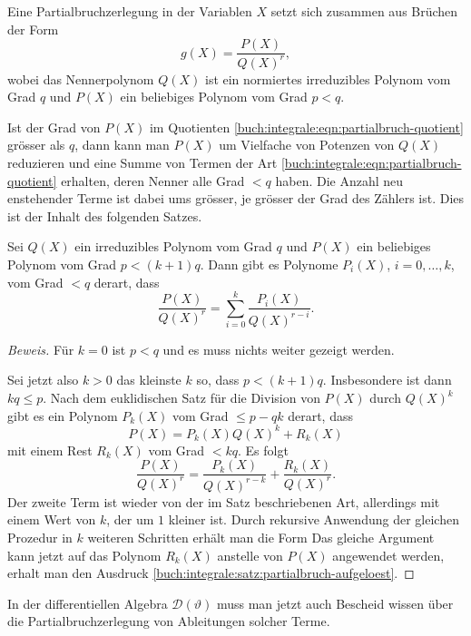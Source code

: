 Eine Partialbruchzerlegung in der Variablen $X$ setzt sich zusammen
aus Brüchen der Form
\begin{equation}
g(X)
=
\frac{P(X)}{Q(X)^r},
\label{buch:integrale:eqn:partialbruch-quotient}
\end{equation}
wobei das Nennerpolynom $Q(X)$ ist ein normiertes irreduzibles Polynom
vom Grad $q$ und $P(X)$ ein beliebiges Polynom vom Grad $p<q$.

Ist der Grad von $P(X)$
im Quotienten 
\eqref{buch:integrale:eqn:partialbruch-quotient}
grösser als $q$, dann kann man $P(X)$ um Vielfache von Potenzen von
$Q(X)$ reduzieren und eine Summe von Termen der Art
\eqref{buch:integrale:eqn:partialbruch-quotient}
erhalten, deren Nenner alle Grad $< q$ haben.
Die Anzahl neu enstehender Terme ist dabei ums grösser, je grösser
der Grad des Zählers ist.
Dies ist der Inhalt des folgenden Satzes.

\begin{satz}
\label{buch:integrale:satz:partialbruch-reduktion}
Sei $Q(X)$ ein irreduzibles Polynom vom Grad $q$ und $P(X)$ ein beliebiges
Polynom vom Grad $p < (k+1)q$.
Dann gibt es Polynome $P_i(X)$, $i=0,\dots,k$, vom Grad $<q$ derart,
dass
\begin{equation}
\frac{P(X)}{Q(X)^r}
=
\sum_{i=0}^k \frac{P_i(X)}{Q(X)^{r-i}}.
\label{buch:integrale:satz:partialbruch-aufgeloest}
\end{equation}
\end{satz}

\begin{proof}[Beweis]
Für $k=0$ ist $p<q$ und es muss nichts weiter gezeigt werden.

Sei jetzt also $k>0$ das kleinste $k$ so, dass $p<(k+1)q$.
Insbesondere ist dann $kq\le p$.
Nach dem euklidischen Satz für die Division von $P(X)$ durch $Q(X)^k$
gibt es ein Polynom $P_k(X)$ vom Grad $\le p-qk$ derart, dass
\[
P(X) = P_k(X)Q(X)^k + R_k(X)
\]
mit einem Rest $R_k(X)$ vom Grad $<kq$.
Es folgt
\[
\frac{ P(X)}{Q(X)^r}
=
\frac{P_k(X)}{Q(X)^{r-k}}
+
\frac{R_k(X)}{Q(X)^r}.
\]
Der zweite Term ist wieder von der im Satz beschriebenen Art, allerdings
mit einem Wert von $k$, der um $1$ kleiner ist.
Durch rekursive Anwendung der gleichen Prozedur in $k$ weiteren Schritten
erhält man die Form
Das gleiche Argument kann jetzt auf das Polynom $R_k(X)$ anstelle
von $P(X)$ angewendet werden,  erhalt man den Ausdruck
\eqref{buch:integrale:satz:partialbruch-aufgeloest}.
\end{proof}

In der differentiellen Algebra $\mathscr{D}(\vartheta)$ muss man jetzt
auch Bescheid wissen über die Partialbruchzerlegung von Ableitungen solcher
Terme.

